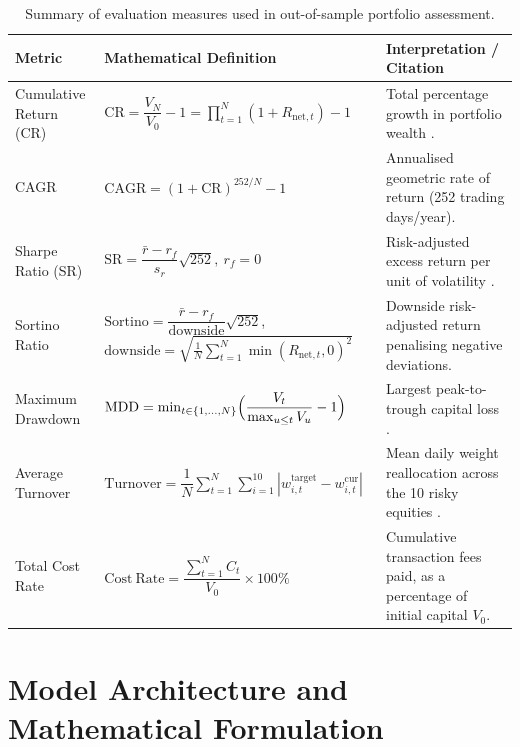 \documentclass[11pt,a4paper]{article}
\numberwithin{equation}{section}
\numberwithin{table}{section}
\numberwithin{figure}{section}
\numberwithin{algorithm}{section}
\begin{document}
\begin{table}[!htbp]
\centering\small
\caption{Summary of evaluation measures used in out-of-sample portfolio assessment.}\label{tab:metrics}
\begin{tabular}{@{}p{2.5cm}p{6.1cm}p{6.3cm}@{}}
\toprule
Metric & Mathematical Definition & Interpretation / Citation\\
\midrule
Cumulative Return (CR) & $\mathrm{CR}=\dfrac{V_N}{V_0}-1=\prod_{t=1}^{N}(1+R_{\mathrm{net},t})-1$ & Total percentage growth in portfolio wealth \cite{zou2024}.\\[6pt]
CAGR & $\mathrm{CAGR}=(1+\mathrm{CR})^{252/N}-1$ & Annualised geometric rate of return (252 trading days/year).\\[3pt]
Sharpe Ratio (SR) & $\mathrm{SR}=\dfrac{\bar r-r_f}{s_r}\sqrt{252},\ r_f=0$ & Risk-adjusted excess return per unit of volatility \cite{millea2021}.\\[6pt]
Sortino Ratio & $\mathrm{Sortino}=\dfrac{\bar r-r_f}{\mathrm{downside}}\sqrt{252}$, $\mathrm{downside}=\sqrt{\tfrac1N\sum_{t=1}^{N}\min(R_{\mathrm{net},t},0)^2}$ & Downside risk-adjusted return penalising negative deviations.\\[8pt]
Maximum Drawdown & $\mathrm{MDD}=\min_{t\in\{1,\dots,N\}}\Bigl(\dfrac{V_t}{\max_{u\le t}V_u}-1\Bigr)$ & Largest peak-to-trough capital loss \cite{zou2024}.\\[8pt]
Average Turnover & $\mathrm{Turnover}=\dfrac1N\sum_{t=1}^{N}\sum_{i=1}^{10}|w_{i,t}^{\mathrm{target}}-w_{i,t}^{\mathrm{cur}}|$ & Mean daily weight reallocation across the 10 risky equities \cite{wang2025}.\\[8pt]
Total Cost Rate & $\mathrm{Cost\ Rate}=\dfrac{\sum_{t=1}^{N}C_t}{V_0}\times100\%$ & Cumulative transaction fees paid, as a percentage of initial capital $V_0$.\\
\bottomrule
\end{tabular}
\end{table}

\section{Model Architecture and Mathematical Formulation}\label{ch:model}
\end{document}
